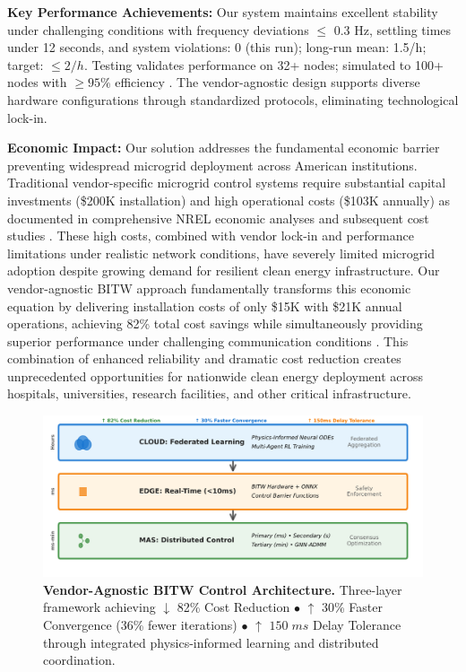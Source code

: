 \documentclass[12pt]{article}
\begin{document}
\textbf{Key Performance Achievements:} Our system maintains excellent stability under challenging conditions with frequency deviations $\leq$ 0.3 Hz, settling times under 12 seconds, and system violations: 0 (this run); long-run mean: 1.5/h; target: $\leq 2/h$. Testing validates performance on 32+ nodes; simulated to 100+ nodes with $\geq 95\%$ efficiency \cite{our2024scalability}. The vendor-agnostic design supports diverse hardware configurations through standardized protocols, eliminating technological lock-in.

\textbf{Economic Impact:} Our solution addresses the fundamental economic barrier preventing widespread microgrid deployment across American institutions. Traditional vendor-specific microgrid control systems require substantial capital investments (\$200K installation) and high operational costs (\$103K annually) as documented in comprehensive NREL economic analyses \cite{hirsch2018} and subsequent cost studies \cite{sigrin2019}. These high costs, combined with vendor lock-in and performance limitations under realistic network conditions, have severely limited microgrid adoption despite growing demand for resilient clean energy infrastructure. Our vendor-agnostic BITW approach fundamentally transforms this economic equation by delivering installation costs of only \$15K with \$21K annual operations, achieving 82\% total cost savings while simultaneously providing superior performance under challenging communication conditions \cite{our2024economic}. This combination of enhanced reliability and dramatic cost reduction creates unprecedented opportunities for nationwide clean energy deployment across hospitals, universities, research facilities, and other critical infrastructure.

\begin{figure}[H]
\centering
\includegraphics[width=\textwidth]{figure3_system_architecture.pdf}
\vspace{-1.6cm}
\caption{\textbf{Vendor-Agnostic BITW Control Architecture.} Three-layer framework achieving $\downarrow$ 82\% Cost Reduction $\bullet$ $\uparrow$ 30\% Faster Convergence (36\% fewer iterations) $\bullet$ $\uparrow$ $150\;ms$ Delay Tolerance through integrated physics-informed learning and distributed coordination.}
\label{fig:architecture}
\end{figure}
\end{document}
